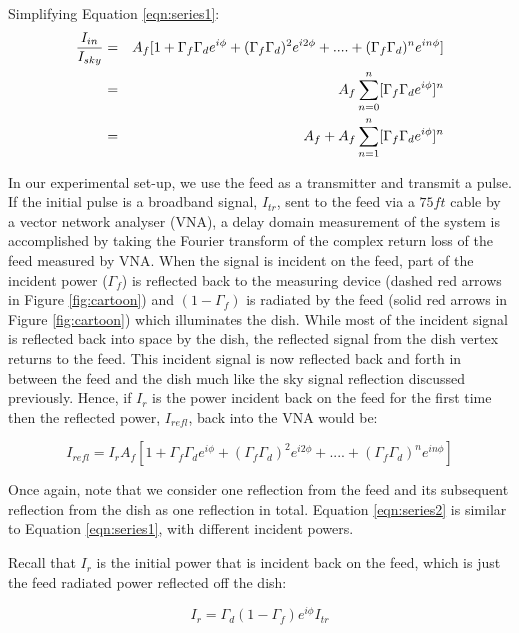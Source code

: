 \documentclass[12pt,preprint]{aastex}
\begin{document}
Simplifying Equation \ref{eqn:series1}:
\begin{eqnarray}\label{eqn:ratio1}
{I_{in} \over I_{sky} } & = & A_{f}[1+ \Gamma_{f}\Gamma_{d} e^{i\phi}+ (\Gamma_{f}\Gamma_{d})^2e^{i2\phi}+ ....+ (\Gamma_{f}\Gamma_{d})^{n}e^{in\phi}] \nonumber\\
      & = & A_{f} \displaystyle\sum\limits_{n=0}^{n} [\Gamma_{f}\Gamma_{d}e^{i \phi}]^{n}\nonumber\\
      & = & A_{f}+A_{f} \displaystyle\sum\limits_{n=1}^{n} [\Gamma_{f}\Gamma_{d}e^{i \phi}]^{n}
\end{eqnarray}

In our experimental set-up, we use the feed as a transmitter and transmit a pulse. If the initial pulse is a broadband signal,
$I_{tr}$, sent to the feed via a $75ft$ cable by a vector network
analyser (VNA), a delay domain measurement of the system is accomplished by
taking the Fourier transform of the complex return loss of the feed measured by VNA. When the signal is incident on
the feed, part of the incident power ($\Gamma_{f}$) is reflected back to the
measuring device (dashed red arrows in Figure \ref{fig:cartoon}) and
$(1-\Gamma_{f})$ is radiated by the feed (solid red arrows in Figure
\ref{fig:cartoon}) which illuminates the dish. While most of the incident signal is reflected back into space by the dish, the reflected signal from the dish vertex returns to
the feed. This incident signal is now
reflected back and forth in between the feed and the dish much like the sky
signal reflection discussed previously.  Hence, if $I_{r}$ is the power
incident back on the feed for the first time then the reflected power, $I_{refl}$,
back into the VNA would be:

\begin{equation}\label{eqn:series2}
I_{refl} =  I_{r}A_{f}[1+ \Gamma_{f}\Gamma_{d} e^{i\phi}+ (\Gamma_{f}\Gamma_{d})^2e^{i2\phi}+ ....+ (\Gamma_{f}\Gamma_{d})^{n}e^{in\phi}]
\end{equation}
 
Once again, note that we consider one reflection from the feed and its subsequent reflection from the dish as one reflection in total. Equation \ref{eqn:series2} is similar to Equation \ref{eqn:series1}, with different incident powers.

Recall that $I_{r}$ is the initial power that is incident back on the feed, which is just the feed radiated power reflected off the dish:
 
\begin{equation}
I_{r}= \Gamma_{d}(1-\Gamma_f)e^{i\phi} I_{tr}
\end{equation}
\end{document}
